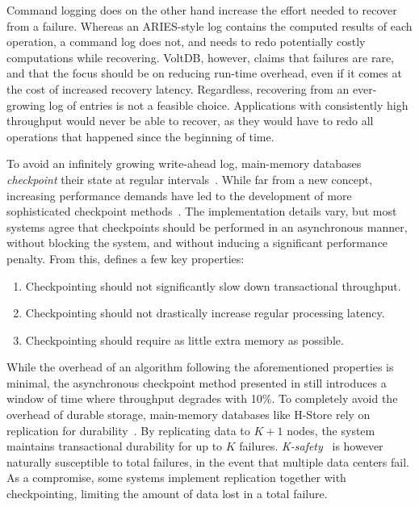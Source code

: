 Command logging does on the other hand increase the effort needed to recover
from a failure. Whereas an ARIES-style log contains the computed results of each
operation, a command log does not, and needs to redo potentially costly
computations while recovering. VoltDB, however, claims that failures are rare,
and that the focus should be on reducing run-time overhead, even if it comes at
the cost of increased recovery latency. Regardless, recovering from an
ever-growing log of entries is not a feasible choice. Applications with
consistently high throughput would never be able to recover, as they would have
to redo all operations that happened since the beginning of time.

To avoid an infinitely growing write-ahead log, main-memory databases
\textit{checkpoint} their state at regular intervals~\cite{main-memory, dali,
margaret, voltdb-recovery, hekaton}. While far from a new concept, increasing
performance demands have led to the development of more sophisticated checkpoint
methods~\cite{memory-checkpoint, siren}. The implementation details vary, but
most systems agree that checkpoints should be performed in an asynchronous
manner, without blocking the system, and without inducing a significant
performance penalty. From this, \cite{memory-checkpoint} defines a few key
properties:

\begin{enumerate}
  \item Checkpointing should not significantly slow down transactional throughput.
  \item Checkpointing should not drastically increase regular processing latency.
  \item Checkpointing should require as little extra memory as possible.
\end{enumerate}

While the overhead of an algorithm following the aforementioned properties is
minimal, the asynchronous checkpoint method presented in
\cite{memory-checkpoint} still introduces a window of time where throughput
degrades with 10\%. To completely avoid the overhead of durable storage,
main-memory databases like H-Store rely on replication for
durability~\cite{hstore}. By replicating data to $ K + 1 $ nodes, the system
maintains transactional durability for up to $ K $ failures.
\textit{K-safety}~\cite{cstore} is however naturally susceptible to total
failures, \eg in the event that multiple data centers fail. As a compromise,
some systems implement replication together with checkpointing, limiting the
amount of data lost in a total failure.

